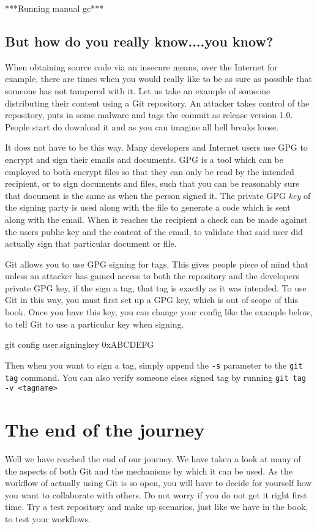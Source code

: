 ***Running manual gc***

\subsection{But how do you really know....you know?}
When obtaining source code via an insecure means, over the Internet for example,
there are times when you would really like to be as sure as possible that someone has not tampered with it.
Let us take an example of someone distributing their content using a Git repository.
An attacker takes control of the repository, puts in some malware and tags the commit as release version 1.0.
People start do download it and as you can imagine all hell breaks loose.

It does not have to be this way.
Many developers and Internet users use GPG to encrypt and sign their emails and documents.
GPG is a tool which can be employed to both encrypt files so that they can only be read by the intended recipient, or to sign documents and files, such that you can be reasonably sure that document is the same as when the person signed it.
The private GPG \emph{key} of the signing party is used along with the file to generate a code which is sent along with the email.
When it reaches the recipient a check can be made against the users public key and the content of the email, to validate that said user did actually sign that particular document or file.

Git allows you to use GPG signing for tags.
This gives people piece of mind that unless an attacker has gained access to both the repository and the developers private GPG key, if the sign a tag, that tag is exactly as it was intended.
To use Git in this way, you must first set up a GPG key, which is out of scope of this book.
Once you have this key, you can change your config like the example below, to tell Git to use a particular key when signing.

\begin{code}
git config user.signingkey 0xABCDEFG
\end{code}

Then when you want to sign a tag, simply append the \texttt{-s} parameter to the \texttt{git tag} command.
You can also verify someone elses signed tag by running \texttt{git tag -v <tagname>}

\section{The end of the journey}
Well we have reached the end of our journey.
We have taken a look at many of the aspects of both Git and the mechanisms by which it can be used.
As the workflow of actually using Git is so open, you will have to decide for yourself how you want to collaborate with others.
Do not worry if you do not get it right first time.
Try a test repository and make up scenarios, just like we have in the book, to test your workflows.

